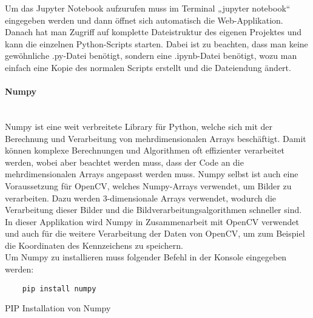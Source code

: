 Um das Jupyter Notebook aufzurufen muss im Terminal „jupyter notebook“ eingegeben werden und dann öffnet sich automatisch die Web-Applikation. 
Danach hat man Zugriff auf komplette Dateistruktur des eigenen Projektes und kann die einzelnen Python-Scripts starten. Dabei ist zu beachten, 
dass man keine gewöhnliche .py-Datei benötigt, sondern eine .ipynb-Datei benötigt, wozu man einfach eine Kopie des normalen Scripts erstellt und die Dateiendung ändert.

\paragraph{Numpy}\mbox{}\\
Numpy ist eine weit verbreitete Library für Python, welche sich mit der Berechnung und Verarbeitung von mehrdimensionalen Arrays beschäftigt. 
Damit können komplexe Berechnungen und Algorithmen oft effizienter verarbeitet werden, wobei aber beachtet werden muss, dass der Code an die 
mehrdimensionalen Arrays angepasst werden muss. Numpy selbst ist auch eine Voraussetzung für OpenCV, welches Numpy-Arrays verwendet, um Bilder zu verarbeiten. 
Dazu werden 3-dimensionale Arrays verwendet, wodurch die Verarbeitung dieser Bilder und die Bildverarbeitungsalgorithmen schneller sind. In dieser 
Applikation wird Numpy in Zusammenarbeit mit OpenCV verwendet und auch für die weitere Verarbeitung der Daten von OpenCV, um zum Beispiel die 
Koordinaten des Kennzeichens zu speichern.\\

Um Numpy zu installieren muss folgender Befehl in der Konsole eingegeben werden:

\begin{listing}[H]
    \begin{verbatim}
    pip install numpy
    \end{verbatim}
    \caption{PIP Installation von Numpy}
\end{listing}

